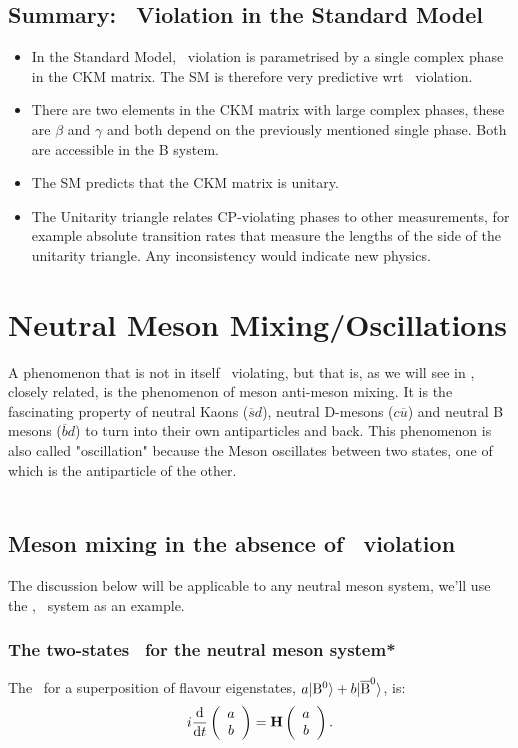 \subsection{Summary: \cp\ Violation in the Standard Model}
 \begin{itemize}
 \item In the Standard Model, \cp\ violation is parametrised by a
 single complex phase in the CKM matrix. The SM is therefore very
 predictive wrt \cp\ violation.
 \item There are two elements in the CKM matrix with large complex
 phases, these are $\beta$ and $\gamma$ and both depend on the
 previously mentioned single phase. Both are accessible in the B
 system.
 \item The SM predicts that the CKM matrix is unitary.
 \item The Unitarity triangle relates CP-violating phases to other
 measurements, for example absolute transition rates that measure the
 lengths of the side of the unitarity triangle. Any inconsistency
 would indicate new physics.
\end{itemize}
\clearpage
\section{Neutral Meson Mixing/Oscillations}
A phenomenon that is not in itself \cp\ violating, but that is, as we will see in , closely related, is the phenomenon of meson anti-meson mixing. It is the fascinating property of neutral Kaons ($\overline{s}d$), neutral D-mesons ($c\overline{u}$) and neutral B mesons ($\overline{b}d$) to turn into their own antiparticles and back. This phenomenon is also called "oscillation" because the Meson oscillates between two states, one of which is the antiparticle of the other.\\
\\

\subsection{Meson mixing in the absence of \cp\ violation}
The discussion below will be applicable to any neutral meson system, we'll use the \Bo, \Bob\ system as an example.

\subsubsection{The two-states \Se\ for the neutral meson system*}
\label{sec:details}
The \Se\ for a superposition of flavour eigenstates, $ a  | {\rm B^0} \rangle + b
 | {\rm \overline{B}^0} \rangle$, is:
\begin{equation}
\label{eq:th.a.se}
%
i\dbyd{}{t}\vII{a}{b}= \op{H} \vII{a}{b}.
%
\end{equation}\\
 

